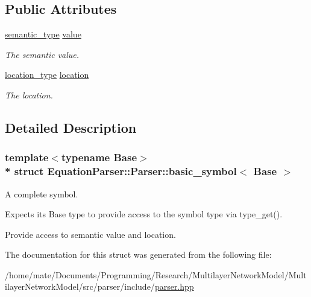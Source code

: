 \subsection*{Public Attributes}
\begin{DoxyCompactItemize}
\item 
\hyperlink{classEquationParser_1_1Parser_a86482685d5f3d44fff68fd4150bbd2dd}{semantic\+\_\+type} \hyperlink{structEquationParser_1_1Parser_1_1basic__symbol_af1042675e7012ce74eb1c18963c2ecd8}{value}\hypertarget{structEquationParser_1_1Parser_1_1basic__symbol_af1042675e7012ce74eb1c18963c2ecd8}{}\label{structEquationParser_1_1Parser_1_1basic__symbol_af1042675e7012ce74eb1c18963c2ecd8}

\begin{DoxyCompactList}\small\item\em The semantic value. \end{DoxyCompactList}\item 
\hyperlink{classEquationParser_1_1Parser_a9c08ca33906dfb521b4ec5989e3620bf}{location\+\_\+type} \hyperlink{structEquationParser_1_1Parser_1_1basic__symbol_a0c1ce0a22bce2efd038930916a006243}{location}\hypertarget{structEquationParser_1_1Parser_1_1basic__symbol_a0c1ce0a22bce2efd038930916a006243}{}\label{structEquationParser_1_1Parser_1_1basic__symbol_a0c1ce0a22bce2efd038930916a006243}

\begin{DoxyCompactList}\small\item\em The location. \end{DoxyCompactList}\end{DoxyCompactItemize}


\subsection{Detailed Description}
\subsubsection*{template$<$typename Base$>$\\*
struct Equation\+Parser\+::\+Parser\+::basic\+\_\+symbol$<$ Base $>$}

A complete symbol.

Expects its Base type to provide access to the symbol type via type\+\_\+get().

Provide access to semantic value and location. 

The documentation for this struct was generated from the following file\+:\begin{DoxyCompactItemize}
\item 
/home/mate/\+Documents/\+Programming/\+Research/\+Multilayer\+Network\+Model/\+Multilayer\+Network\+Model/src/parser/include/\hyperlink{parser_8hpp}{parser.\+hpp}\end{DoxyCompactItemize}
